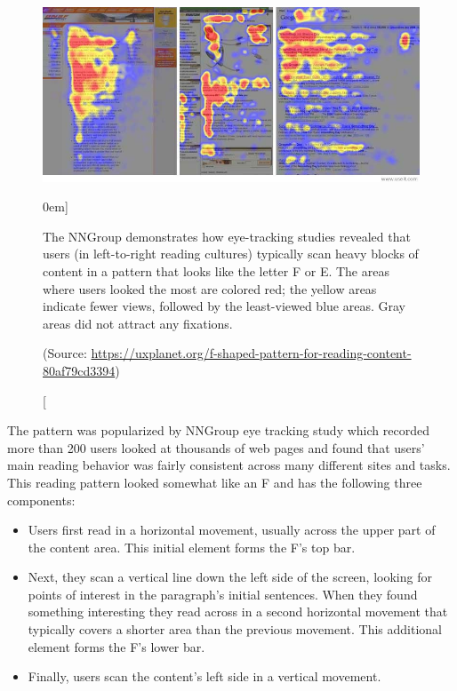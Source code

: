 \begin{figure}%
	\centering
  \includegraphics[width=1\textwidth]{../figures/f-pattern_screens.jpeg}
  \caption[][0em]{The NNGroup demonstrates how eye-tracking studies revealed that users (in left-to-right reading cultures) typically scan heavy blocks of content in a pattern that looks like the letter F or E. The areas where users looked the most are colored red; the yellow areas indicate fewer views, followed by the least-viewed blue areas. Gray areas did not attract any fixations. \par (Source: \url{https://uxplanet.org/f-shaped-pattern-for-reading-content-80af79cd3394})}
  \label{fig:f-layout}
\end{figure}

The pattern was popularized by NNGroup eye tracking study which recorded more than 200 users looked at thousands of web pages and found that users’ main reading behavior was fairly consistent across many different sites and tasks. This reading pattern looked somewhat like an F and has the following three components:

\begin{itemize}
	\item Users first read in a horizontal movement, usually across the upper part of the content area. This initial element forms the F’s top bar.
	
	\item Next, they scan a vertical line down the left side of the screen, looking for points of interest in the paragraph’s initial sentences. When they found something interesting they read across in a second horizontal movement that typically covers a shorter area than the previous movement. This additional element forms the F’s lower bar.
	
	\item Finally, users scan the content’s left side in a vertical movement.
\end{itemize}

